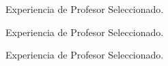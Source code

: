 \begin{figure}[h!]
 	\begin{center}
 		\caption{Experiencia de Profesor Seleccionado.}
 		\label{p2}
 	\end{center}
 \end{figure}
\begin{figure}[h!]
	\begin{center}
		\caption{Experiencia de Profesor Seleccionado.}
		\label{p2}
	\end{center}
\end{figure}
\begin{figure}[h!]
	\begin{center}
		\caption{Experiencia de Profesor Seleccionado.}
		\label{p2}
	\end{center}
\end{figure}
